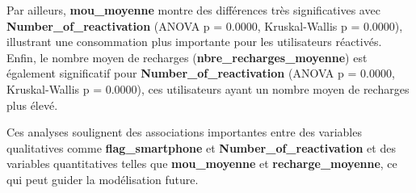 Par ailleurs, \textbf{mou\_moyenne} montre des différences très significatives avec \textbf{Number\_of\_reactivation} (ANOVA p = 0.0000, Kruskal-Wallis p = 0.0000), illustrant une consommation plus importante pour les utilisateurs réactivés. Enfin, le nombre moyen de recharges (\textbf{nbre\_recharges\_moyenne}) est également significatif pour \textbf{Number\_of\_reactivation} (ANOVA p = 0.0000, Kruskal-Wallis p = 0.0000), ces utilisateurs ayant un nombre moyen de recharges plus élevé.

Ces analyses soulignent des associations importantes entre des variables qualitatives comme \textbf{flag\_smartphone} et \textbf{Number\_of\_reactivation} et des variables quantitatives telles que \textbf{mou\_moyenne} et \textbf{recharge\_moyenne}, ce qui peut guider la modélisation future.








